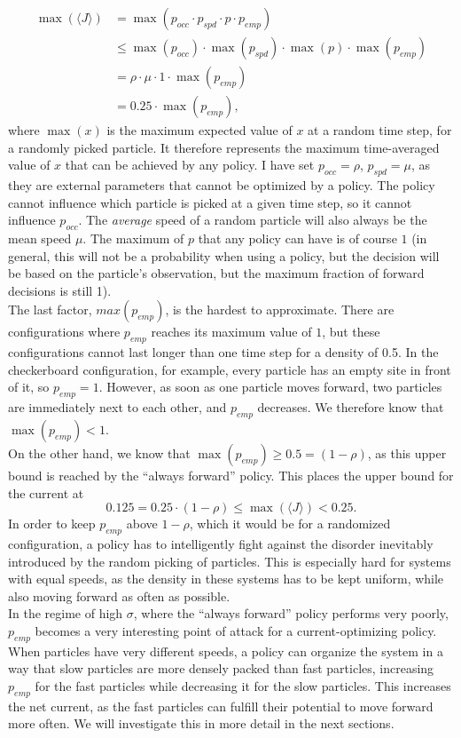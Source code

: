 \begin{align*}
    \max(\langle J\rangle) &= \max(p_{occ} \cdot p_{spd} \cdot p \cdot p_{emp}) \\
                           &\le \max(p_{occ}) \cdot \max(p_{spd}) \cdot \max(p) \cdot \max(p_{emp}) \\
                           &= \rho \cdot \mu \cdot 1 \cdot \max(p_{emp}) \\
                            &= 0.25 \cdot \max(p_{emp})\text{,}
\end{align*}
where $\max(x)$ is the maximum expected value of $x$ at a random time step, for a randomly picked particle. It therefore represents the maximum time-averaged value of $x$ that can be achieved by any policy. I have set $p_{occ}=\rho$, $p_{spd}=\mu$, as they are external parameters that cannot be optimized by a policy. The policy cannot influence which particle is picked at a given time step, so it cannot influence $p_{occ}$. The \textit{average} speed of a random particle will also always be the mean speed $\mu$. The maximum of $p$ that any policy can have is of course $1$ (in general, this will not be a probability when using a policy, but the decision will be based on the particle's observation, but the maximum fraction of forward decisions is still 1). 
\\
The last factor, $max(p_{emp})$, is the hardest to approximate. There are configurations where $p_{emp}$ reaches its maximum value of $1$, but these configurations cannot last longer than one time step for a density of 0.5. In the checkerboard configuration, for example, every particle has an empty site in front of it, so $p_{emp}=1$. However, as soon as one particle moves forward, two particles are immediately next to each other, and $p_{emp}$ decreases. We therefore know that $\max(p_{emp})<1$.
\\
On the other hand, we know that $\max(p_{emp})\ge0.5=(1-\rho)$, as this upper bound is reached by the \enquote{always forward} policy. This places the upper bound for the current at
\begin{equation}
   0.125 = 0.25 \cdot (1-\rho) \le \max(\langle J\rangle) < 0.25 \text{.}
\end{equation}
In order to keep $p_{emp}$ above $1-\rho$, which it would be for a randomized configuration, a policy has to intelligently fight against the disorder inevitably introduced by the random picking of particles. This is especially hard for systems with equal speeds, as the density in these systems has to be kept uniform, while also moving forward as often as possible.
\\
In the regime of high $\sigma$, where the \enquote{always forward} policy performs very poorly, $p_{emp}$ becomes a very interesting point of attack for a current-optimizing policy. When particles have very different speeds, a policy can organize the system in a way that slow particles are more densely packed than fast particles, increasing $p_{emp}$ for the fast particles while decreasing it for the slow particles. This increases the net current, as the fast particles can fulfill their potential to move forward more often. We will investigate this in more detail in the next sections.


